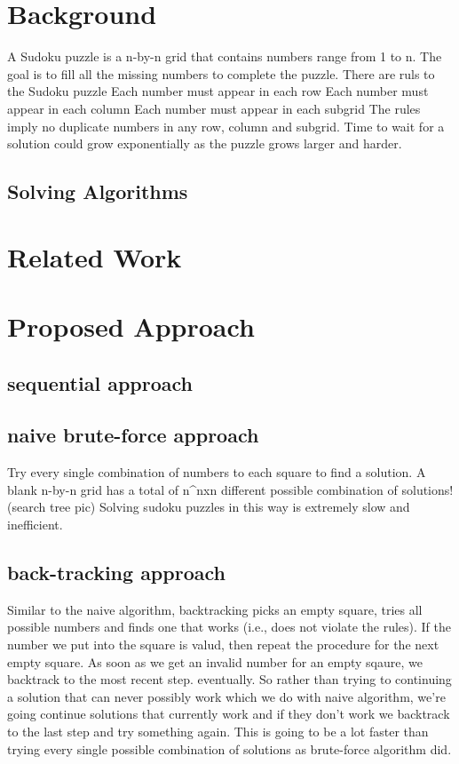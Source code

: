 \documentclass[12pt,leqno,a4paper,dvipsnames]{article}
\begin{document}
\newpage %
\tableofcontents

\newpage %
\section{Background} \label{background}

    A Sudoku puzzle is a n-by-n grid that contains numbers range from 1 to n.
	The goal is to fill all the missing numbers to complete the puzzle.
	There are ruls to the Sudoku puzzle
	Each number must appear in each row
	Each number must appear in each column
	Each number must appear in each subgrid
	The rules imply no duplicate numbers in any row, column and subgrid.
	Time to wait for a solution could grow exponentially as the puzzle grows larger and harder. 

	\subsection{Solving Algorithms}
	
\newpage %
\section{Related Work} \label{related_work}


\newpage %
\section{Proposed Approach} \label{approach}
	\subsection{sequential approach}
		\subsection{naive brute-force approach}
		Try every single combination of numbers to each square to find a solution.
		A blank n-by-n grid has a total of n^nxn different possible combination of solutions! 
		(search tree pic)
		Solving sudoku puzzles in this way is extremely slow and inefficient.
		\subsection{back-tracking approach}
		Similar to the naive algorithm, backtracking picks an empty square, tries all possible numbers and finds one that works (i.e., does not violate the rules).
		If the number we put into the square is valud, then repeat the procedure for the next empty square.
		As soon as we get an invalid number for an empty sqaure, we backtrack to the most recent step.
		eventually.
		So rather than trying to continuing a solution that can never possibly work which we do with naive algorithm,
		we're going continue solutions that currently work and if they don't work we backtrack to the last step and try something again.
		This is going to be a lot faster than trying every single possible combination of solutions as brute-force algorithm did.
\end{document}
